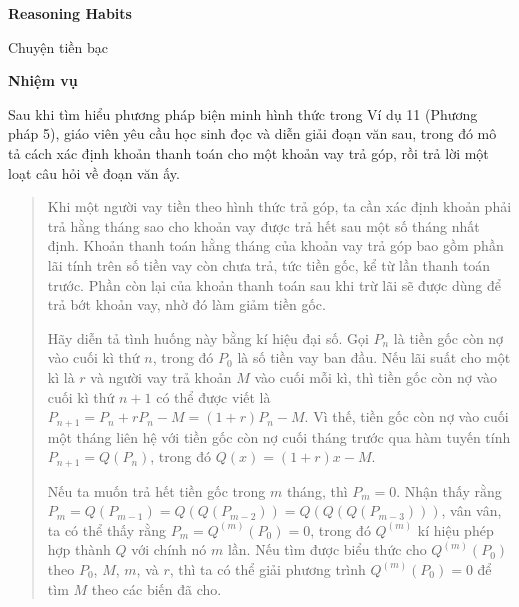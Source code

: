 {\begin{hanglist}
    \end{hanglist}

    \textbf{Reasoning Habits}

    \begin{hanglist}


    \end{hanglist}
  }
  {
    Chuyện tiền bạc
  }
  {
    \textbf{Nhiệm vụ}

    Sau khi tìm hiểu phương pháp biện minh hình thức trong Ví dụ 11 (Phương pháp 5), giáo viên yêu cầu học sinh đọc và diễn giải đoạn văn sau, trong đó mô tả cách xác định khoản thanh toán cho một khoản vay trả góp, rồi trả lời một loạt câu hỏi về đoạn văn ấy.

    \begin{quote}
      Khi một người vay tiền theo hình thức trả góp, ta cần xác định khoản phải trả hằng tháng sao cho khoản vay được trả hết sau một số tháng nhất định. Khoản thanh toán hằng tháng của khoản vay trả góp bao gồm phần lãi tính trên số tiền vay còn chưa trả, tức tiền gốc, kể từ lần thanh toán trước. Phần còn lại của khoản thanh toán sau khi trừ lãi sẽ được dùng để trả bớt khoản vay, nhờ đó làm giảm tiền gốc.\vspace{\baselineskip}

      Hãy diễn tả tình huống này bằng kí hiệu đại số. Gọi $P_n$ là tiền gốc còn nợ vào cuối kì thứ $n$, trong đó $P_0$ là số tiền vay ban đầu. Nếu lãi suất cho một kì là $r$ và người vay trả khoản $M$ vào cuối mỗi kì, thì tiền gốc còn nợ vào cuối kì thứ $n+1$ có thể được viết là $P_{n+1}=P_n+rP_n-M=(1+r)P_n-M$. Vì thế, tiền gốc còn nợ vào cuối một tháng liên hệ với tiền gốc còn nợ cuối tháng trước qua hàm tuyến tính $P_{n+1}=Q(P_n)$, trong đó $Q(x)=(1+r)x-M$.\vspace{3\baselineskip}

      Nếu ta muốn trả hết tiền gốc trong $m$ tháng, thì $P_m=0$. Nhận thấy rằng $P_m=Q(P_{m-1})=Q(Q(P_{m-2}))=Q(Q(Q(P_{m-3})))$, vân vân, ta có thể thấy rằng $P_m=Q^{(m)}(P_0)=0$, trong đó $Q^{(m)}$ kí hiệu phép hợp thành $Q$ với chính nó $m$ lần. Nếu tìm được biểu thức cho $Q^{(m)}(P_0)$ theo $P_0$, $M$, $m$, và $r$, thì ta có thể giải phương trình $Q^{(m)}(P_0)=0$ để tìm $M$ theo các biến đã cho.


\end{quote}}
